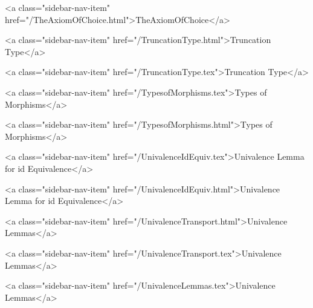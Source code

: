       
    
      
        
          <a class="sidebar-nav-item" href="/TheAxiomOfChoice.html">TheAxiomOfChoice</a>
        
      
    
      
        
          <a class="sidebar-nav-item" href="/TruncationType.html">Truncation Type</a>
        
      
    
      
        
          <a class="sidebar-nav-item" href="/TruncationType.tex">Truncation Type</a>
        
      
    
      
        
          <a class="sidebar-nav-item" href="/TypesofMorphisms.tex">Types of Morphisms</a>
        
      
    
      
        
          <a class="sidebar-nav-item" href="/TypesofMorphisms.html">Types of Morphisms</a>
        
      
    
      
        
          <a class="sidebar-nav-item" href="/UnivalenceIdEquiv.tex">Univalence Lemma for id Equivalence</a>
        
      
    
      
        
          <a class="sidebar-nav-item" href="/UnivalenceIdEquiv.html">Univalence Lemma for id Equivalence</a>
        
      
    
      
        
          <a class="sidebar-nav-item" href="/UnivalenceTransport.html">Univalence Lemmas</a>
        
      
    
      
        
          <a class="sidebar-nav-item" href="/UnivalenceTransport.tex">Univalence Lemmas</a>
        
      
    
      
        
          <a class="sidebar-nav-item" href="/UnivalenceLemmas.tex">Univalence Lemmas</a>
        
      
    
      
        
